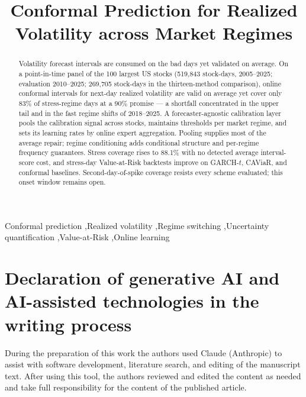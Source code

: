 \documentclass[review]{elsarticle}
\begin{document}
\begin{frontmatter}

\title{Conformal Prediction for Realized Volatility across Market Regimes}

\begin{abstract}
Volatility forecast intervals are consumed on the bad days yet
validated on average. On a point-in-time panel of the 100
largest US stocks (519{,}843 stock-days, 2005--2025; evaluation
2010--2025; 269{,}705 stock-days in the thirteen-method comparison),
online conformal intervals for next-day realized volatility are valid
on average yet cover only 83\% of stress-regime days at a 90\% promise
--- a shortfall concentrated in the upper tail and in the fast regime
shifts of 2018--2025. A forecaster-agnostic calibration layer pools the
calibration signal across stocks, maintains thresholds per market
regime, and sets its learning rates by online expert
aggregation. Pooling supplies most of the average repair; regime
conditioning adds conditional structure and per-regime frequency
guarantees. Stress coverage rises to 88.1\% with no detected
average interval-score cost, and stress-day Value-at-Risk backtests improve
on GARCH-$t$, CAViaR, and conformal baselines. Second-day-of-spike
coverage resists every scheme evaluated; this onset window remains
open.
\end{abstract}


\begin{keyword}
Conformal prediction \sep Realized volatility \sep Regime switching \sep Uncertainty quantification \sep Value-at-Risk \sep Online learning
\end{keyword}

\end{frontmatter}












\section*{Declaration of generative AI and AI-assisted technologies in
the writing process}
During the preparation of this work the authors used Claude (Anthropic)
to assist with software development, literature search, and editing of
the manuscript text. After using this tool, the authors reviewed and
edited the content as needed and take full responsibility for the
content of the published article.



\end{document}
